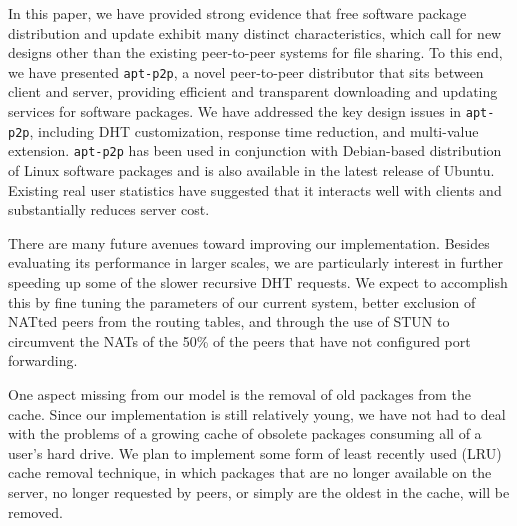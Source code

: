 \documentclass[conference]{IEEEtran}
\begin{document}
In this paper, we have provided strong evidence that free software package distribution
and update exhibit many distinct characteristics, which call for new designs other
than the existing peer-to-peer systems for file sharing. To this end, we have
presented \texttt{apt-p2p}, a novel peer-to-peer distributor that sits between
client and server, providing efficient and transparent downloading and updating services
for software packages. We have addressed the key design issues in \texttt{apt-p2p}, including DHT customization,
response time reduction, and multi-value extension. \texttt{apt-p2p}  has been used in conjunction with Debian-based distribution of Linux
software packages and is also available in the latest release of Ubuntu. Existing real user statistics
have suggested that it interacts well with clients and substantially reduces server cost.

There are many future avenues toward improving our implementation. Besides
evaluating its performance in larger scales, we are particularly interest in further speeding up some of the slower recursive
DHT requests. We expect to accomplish this by fine tuning the
parameters of our current system, better exclusion of NATted peers
from the routing tables, and through the use of STUN \cite{STUN} to
circumvent the NATs of the 50\% of the peers that have not
configured port forwarding.

One aspect missing from our model is the removal of old packages
from the cache. Since our implementation is still relatively young,
we have not had to deal with the problems of a growing cache of
obsolete packages consuming all of a user's hard drive. We plan to
implement some form of least recently used (LRU) cache removal
technique, in which packages that are no longer available on the
server, no longer requested by peers, or simply are the oldest in
the cache, will be removed.





\end{document}
